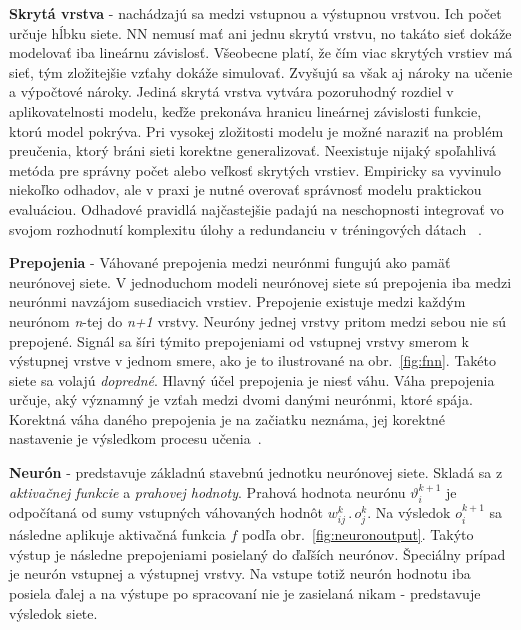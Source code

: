 \textbf{Skrytá vrstva} - nachádzajú sa medzi vstupnou a výstupnou vrstvou. Ich počet určuje hĺbku siete. NN nemusí mať ani jednu skrytú vrstvu, no takáto sieť dokáže modelovať iba lineárnu závislosť. Všeobecne platí, že čím viac skrytých vrstiev má sieť, tým zložitejšie vzťahy dokáže simulovať. Zvyšujú sa však aj nároky na učenie a výpočtové nároky. Jediná skrytá vrstva vytvára pozoruhodný rozdiel v aplikovatelnosti modelu, keďže prekonáva hranicu lineárnej závislosti funkcie, ktorú model pokrýva. Pri vysokej zložitosti modelu je možné naraziť na problém preučenia, ktorý bráni sieti korektne generalizovať. Neexistuje nijaký spoľahlivá metóda pre správny počet alebo veľkosť skrytých vrstiev. Empiricky sa vyvinulo niekoľko odhadov, ale v praxi je nutné overovať správnosť modelu praktickou evaluáciou. Odhadové pravidlá najčastejšie padajú na neschopnosti integrovať vo svojom rozhodnutí komplexitu úlohy a redundanciu v tréningových dátach ~\cite{Goodfellow-et-al-2016-Book}.
\noindent

\textbf{Prepojenia} - Váhované prepojenia medzi neurónmi fungujú ako pamäť neurónovej siete. V jednoduchom modeli neurónovej siete sú prepojenia iba medzi neurónmi navzájom susediacich vrstiev. Prepojenie existuje medzi každým neurónom \textit{n}-tej do \textit{n+1} vrstvy. Neuróny jednej vrstvy pritom medzi sebou nie sú prepojené. Signál sa šíri týmito prepojeniami od vstupnej vrstvy smerom k výstupnej vrstve v jednom smere, ako je to ilustrované na obr.~\ref{fig:fnn}. Takéto siete sa volajú \textit{dopredné}. Hlavný účel prepojenia je niesť váhu. Váha prepojenia určuje, aký významný je vzťah medzi dvomi danými neurónmi, ktoré spája. Korektná váha daného prepojenia je na začiatku neznáma, jej korektné nastavenie je výsledkom procesu učenia~\cite{Goodfellow-et-al-2016-Book}.
\noindent

\textbf{Neurón} - predstavuje základnú stavebnú jednotku neurónovej siete. Skladá sa z \textit{aktivačnej funkcie} a \textit{prahovej hodnoty}. Prahová hodnota neurónu $\vartheta _{i}^{k+1}$  je odpočítaná od sumy vstupných váhovaných hodnôt $ w_{ij}^{k}\, .\, o_{j}^{k}$. 
\newline
Na výsledok $o_{i}^{k+1}$ sa následne aplikuje aktivačná funkcia $f$ podľa obr.~\ref{fig:neuronoutput}. Takýto výstup je následne prepojeniami posielaný do ďaľších neurónov. Špeciálny prípad je neurón vstupnej a výstupnej vrstvy. Na vstupe totiž neurón hodnotu iba posiela ďalej a na výstupe po spracovaní nie je zasielaná nikam - predstavuje výsledok siete.
\newline



